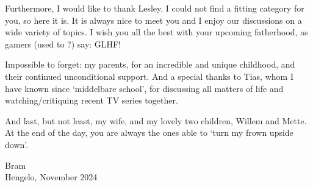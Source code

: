 Furthermore, I would like to thank Lesley. I could not find a fitting category for you, so here it is. It is always nice to meet you and I enjoy our discussions on a wide variety of topics. I wish you all the best with your upcoming fatherhood, as gamers (used to ?) say: GLHF!

Impossible to forget: my parents, for an incredible and unique childhood, and their continued unconditional support. And a special thanks to Tias, whom I have known since `middelbare school', for discussing all matters of life and watching/critiquing recent TV series together.

And last, but not least, my wife, and my lovely two children, Willem and Mette. At the end of the day, you are always the ones able to `turn my frown upside down'.

\vspace{2cm}
\noindent Bram\\
Hengelo, November 2024

